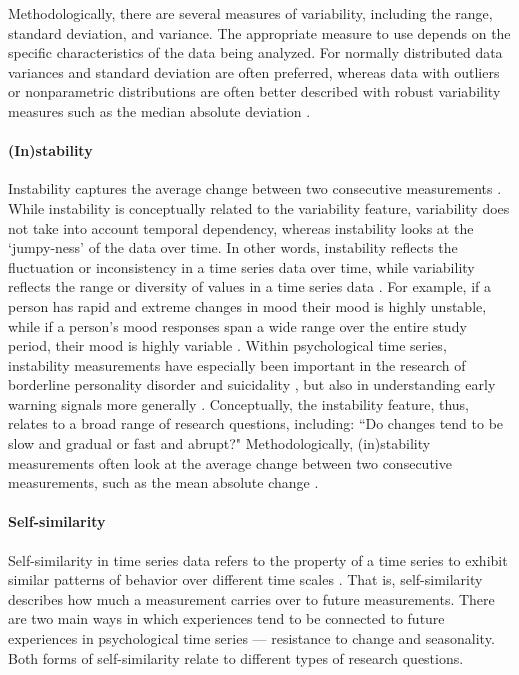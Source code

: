 \documentclass[man, 12pt, a4paper, mask, floatsintext]{apa7}
\theoremstyle{break}
\theoremstyle{plain}
\begin{document}
Methodologically, there are several measures of variability, including the range, standard deviation, and variance. The appropriate measure to use depends on the specific characteristics of the data being analyzed. For normally distributed data variances and standard deviation are often preferred, whereas data with outliers or nonparametric distributions are often better described with robust variability measures such as the median absolute deviation \citep{weisberg1992}.

\paragraph{(In)stability} Instability captures the average change between two consecutive measurements \citep{ebner-priemer2009}. While instability is conceptually related to the variability feature, variability does not take into account temporal dependency, whereas instability looks at the `jumpy-ness' of the data over time. In other words, instability reflects the fluctuation or inconsistency in a time series data over time, while variability reflects the range or diversity of values in a time series data \citep{trull2008}. For example, if a person has rapid and extreme changes in mood their mood is highly unstable, while if a person's mood responses span a wide range over the entire study period, their mood is highly variable \citep{jahng2008}. Within psychological time series, instability measurements have especially been important in the research of borderline personality disorder \citep{trull2008} and suicidality \citep{kivela2022}, but also in understanding early warning signals more generally \citep{wichers2019}. Conceptually, the instability feature, thus, relates to a broad range of research questions, including: ``Do changes tend to be slow and gradual or fast and abrupt?" Methodologically, (in)stability measurements often look at the average change between two consecutive measurements, such as the mean absolute change \citep[e.g.,][]{ebner-priemer2009,barandas2020}. 

\paragraph{Self-similarity} Self-similarity in time series data refers to the property of a time series to exhibit similar patterns of behavior over different time scales \citep{dmello2021}. That is, self-similarity describes how much a measurement carries over to future measurements. There are two main ways in which experiences tend to be connected to future experiences in psychological time series --- resistance to change and seasonality. Both forms of self-similarity relate to different types of research questions. 
\end{document}
